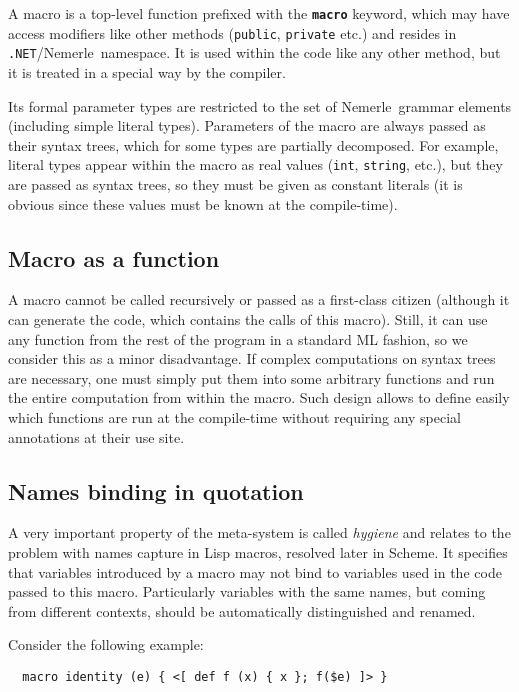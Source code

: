 \documentclass{llncs}
\newcommand{\net}[0]{{\tt .NET}}
\newcommand{\nem}[0]{Nemerle}
\newcommand{\kw}[1]{{\tt \bf #1}}
\begin{document}
A macro is a top-level function prefixed with the \kw{macro} keyword, 
which may have access modifiers like other methods (\verb,public,, \verb,private, etc.) 
and resides in \net/\nem\ namespace. It is used within the code like
any other method, but it is treated in a special way by the compiler.

Its formal parameter types are restricted to the set of \nem\
grammar elements (including simple literal types). Parameters of 
the macro are always passed as their syntax trees, which for some
types are partially decomposed. For example, literal types appear
within the macro as real values (\verb,int,, \verb,string,, etc.),
but they are passed
as syntax trees, so they must be given as constant literals (it is
obvious since these values must be known at the compile-time).

\subsection{Macro as a function}
A macro cannot be called recursively or passed as a first-class citizen
(although it can generate the code, which contains the calls of this macro).
Still, it can use any function from the rest of the program in a standard ML
fashion, so we consider this as a minor disadvantage. If complex 
computations on syntax trees are necessary, one must simply put them 
into some arbitrary functions and run the entire computation from within 
the macro. Such design allows to define easily which functions are run 
at the compile-time without requiring any special annotations at their use site.

\subsection{Names binding in quotation}
A very important property of the meta-system is called \emph{hygiene} 
and relates to the problem with names capture in Lisp macros, resolved 
later in Scheme. It specifies that variables introduced by a macro 
may not bind to variables used in the code passed to this macro. Particularly 
variables with the same names, but coming from different contexts, should be 
automatically distinguished and renamed.

Consider the following example:

\begin{verbatim}
  macro identity (e) { <[ def f (x) { x }; f($e) ]> }
\end{verbatim} %
\end{document}
